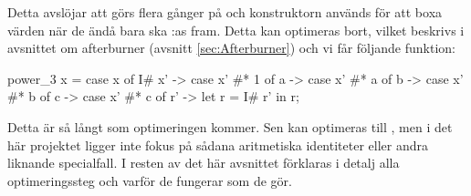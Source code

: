 \documentclass[../Optimise]{subfiles}
\begin{document}
Detta avslöjar att  görs flera gånger på  och 
konstruktorn  används för att boxa värden
när de ändå bara ska :as fram.
Detta kan optimeras bort, vilket beskrivs i avsnittet om afterburner
(avsnitt \ref{sec:Afterburner}) och vi får följande funktion:

\begin{codeEx}
power_3 x = case x of
    { I# x' -> case x' #* 1 of
        { a -> case x' #* a of
            { b -> case x' #* b of
                { c -> case x' #* c of
                    { r' -> let r = I# r' in r}}}}};
\end{codeEx}

Detta är så långt som optimeringen kommer. Sen kan 
optimeras till , men i det här projektet ligger inte fokus på sådana 
aritmetiska identiteter eller andra liknande
specialfall. I resten av det här avsnittet förklaras i detalj alla
optimeringssteg och varför de fungerar som de gör.
\end{document}
